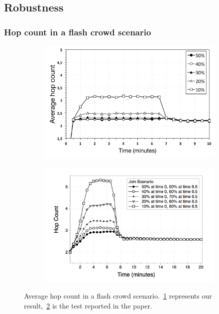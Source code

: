 \documentclass{beamer}
\begin{document}
\subsection{Robustness}

\begin{frame}
\frametitle{Hop count in a flash crowd scenario}

\begin{figure}
\centering
\begin{subfigure}{.5\textwidth}
  \centering
  \includegraphics[keepaspectratio=true, width=1\linewidth]{images/average_hop_count_flash_crowd_1impl}
  \caption{}
  \label{fig:average_hop_count_flash_crowd_1impl}
\end{subfigure}%
\begin{subfigure}{.5\textwidth}
  \centering
  \includegraphics[keepaspectratio=true, width=1\linewidth]{images/paper_average_hop_count_flash_crowd}
  \caption{}
  \label{fig:paper_average_hop_count_flash_crowd}
\end{subfigure}
\caption{Average hop count in a flash crowd scenario.~\ref{fig:average_hop_count_flash_crowd_1impl} represents our result,~\ref{fig:paper_average_hop_count_flash_crowd} is the test reported in the paper.}
\label{fig:robustness_hop_count_flash_crowd}
\end{figure}

\end{frame}
\end{document}
